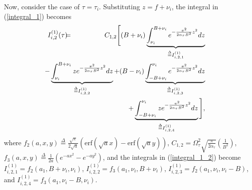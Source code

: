 Now, consider the case of $\tau=\tau_i$.
Substituting $z=f+\nu_{i}$, the integral in (\ref{integral_1}) becomes
\begin{eqnarray}
I_{i,2}^{(1)}(\tau) & \hspace{-2mm} = & \hspace{-2mm} C_{1,2}\Bigg[(B+\nu_i)\underbrace{\int_{\nu_{i}}^{B+\nu_{i}}e^{-\frac{\pi^{2}}{2\alpha_{\tau}B^{2}}z^{2}}dz}_{\overset{\Delta}{=}I_{i,2,1}^{(1)}} \nonumber \\
& \hspace{-25mm} & \hspace{-17mm} -\underbrace{\int_{\nu_{i}}^{B+\nu_{i}}ze^{-\frac{\pi^{2}}{2\alpha_{\tau}B^{2}}z^{2}}dz}_{\overset{\Delta}{=}I_{i,2,2}^{(1)}} +(B-\nu_i)\underbrace{\int_{-B+\nu_{i}}^{\nu_{i}}e^{-\frac{\pi^{2}}{2\alpha_{\tau}B^{2}}z^{2}}dz}_{\overset{\Delta}{=}I_{i,2,3}^{(1)}} \nonumber \\
& \hspace{-25mm} & \hspace{-17mm} +\underbrace{\int_{-B+\nu_{i}}^{\nu_{i}}ze^{-\frac{\pi^{2}}{2\alpha_{\tau}B^{2}}z^{2}}dz}_{\overset{\Delta}{=}I_{i,2,4}^{(1)}}\Bigg], 
\label{integral_1_2}
\end{eqnarray}
where 
$f_2(a,x,y)\overset{\Delta}{=}\frac{\sqrt{\pi}}{2\sqrt{a}}\left(\mathrm{erf}(\sqrt{a}x)-\mathrm{erf}(\sqrt{a}y)\right)$, %
$C_{1,2}=\Omega_{\tau}^{2}\sqrt{\frac{\pi}{2\alpha_{\tau}}}\left(\frac{1}{B^{2}}\right)$, 
$f_3(a,x,y)\overset{\Delta}{=}\frac{1}{2a}\left(e^{-a x^{2}}-e^{-a y^{2}}\right)$,
and the integrals in (\ref{integral_1_2}) become
$I_{i,2,1}^{(1)}=f_2(a_1,B+\nu_i,\nu_i)$,
$I_{i,2,2}^{(1)}=f_3(a_1,\nu_i,B+\nu_i)$,
$I_{i,2,3}^{(1)}=f_2(a_1,\nu_i,\nu_i-B)$,
and
$I_{i,2,4}^{(1)}=f_3(a_1,\nu_i-B,\nu_i)$.

